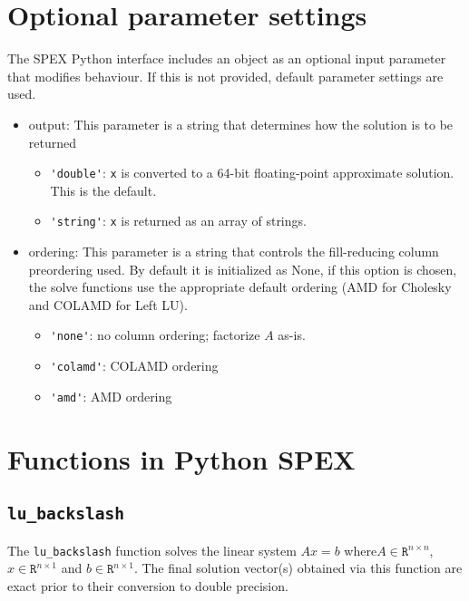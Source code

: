 \documentclass[12pt,oneside]{book}
\theoremstyle{definition}
\begin{document}
\section{Optional parameter settings}\label{s:Python:option}
The SPEX Python interface includes an object as an optional input parameter that modifies behaviour. If this is not provided, default parameter settings are used.
\begin{itemize}
    \item output: This parameter is a string that determines how the solution is to be returned
    \begin{itemize}
        \item \verb|'double'|:  \verb|x| is converted to a 64-bit
            floating-point approximate solution.  This is the default.
        \item \verb|'string'|:  \verb|x| is returned as an array of strings.
    \end{itemize}
    \item ordering: This parameter is a string that controls the fill-reducing column preordering used. By default it is initialized as None, if this option is chosen, the solve functions use the appropriate default ordering (AMD for Cholesky and COLAMD for Left LU).
        \begin{itemize}
            \item \verb|'none'|: no column ordering; factorize $A$ as-is.
            \item \verb|'colamd'|: COLAMD ordering 
            \item \verb|'amd'|: AMD ordering 
        \end{itemize}
\end{itemize}


\section{Functions in Python SPEX}\label{s:Python:Funcs}

\subsection{\texttt{lu\_backslash}}
The \verb|lu_backslash| function solves the linear system $Ax=b$ where$A \in \mathtt{R}^{n \times n}$, $x \in \mathtt{R}^{n \times 1}$ and $b \in \mathtt{R}^{n \times 1}$. The final solution vector(s) obtained via this function are exact prior to their conversion to double precision. 
\end{document}
